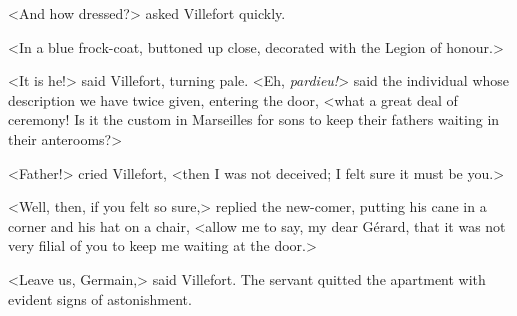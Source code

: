  <And how dressed?> asked Villefort quickly. 

 <In a blue frock-coat, buttoned up close, decorated with the Legion of honour.> 

 <It is he!> said Villefort, turning pale.  <Eh, \textit{pardieu!}> said the individual whose description we have twice given, entering the door, <what a great deal of ceremony! Is it the custom in Marseilles for sons to keep their fathers waiting in their anterooms?> 

 <Father!> cried Villefort, <then I was not deceived; I felt sure it must be you.> 

 <Well, then, if you felt so sure,> replied the new-comer, putting his cane in a corner and his hat on a chair, <allow me to say, my dear Gérard, that it was not very filial of you to keep me waiting at the door.> 

 <Leave us, Germain,> said Villefort. The servant quitted the apartment with evident signs of astonishment. 